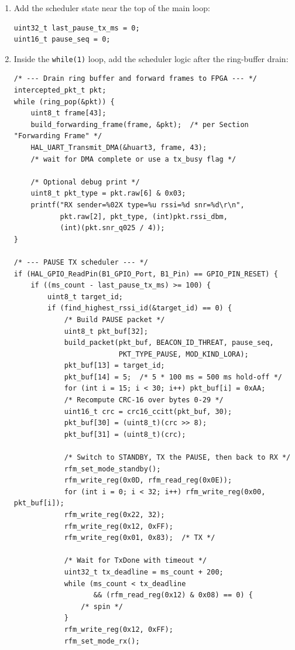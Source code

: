 \documentclass[11pt,letterpaper]{article}
\begin{document}
\begin{enumerate}[leftmargin=2em]
	\item Add the scheduler state near the top of the main loop:
\begin{verbatim}
uint32_t last_pause_tx_ms = 0;
uint16_t pause_seq = 0;
\end{verbatim}

	\item Inside the \texttt{while(1)} loop, add the scheduler logic after the ring-buffer drain:
\begin{verbatim}
/* --- Drain ring buffer and forward frames to FPGA --- */
intercepted_pkt_t pkt;
while (ring_pop(&pkt)) {
    uint8_t frame[43];
    build_forwarding_frame(frame, &pkt);  /* per Section "Forwarding Frame" */
    HAL_UART_Transmit_DMA(&huart3, frame, 43);
    /* wait for DMA complete or use a tx_busy flag */

    /* Optional debug print */
    uint8_t pkt_type = pkt.raw[6] & 0x03;
    printf("RX sender=%02X type=%u rssi=%d snr=%d\r\n",
           pkt.raw[2], pkt_type, (int)pkt.rssi_dbm,
           (int)(pkt.snr_q025 / 4));
}

/* --- PAUSE TX scheduler --- */
if (HAL_GPIO_ReadPin(B1_GPIO_Port, B1_Pin) == GPIO_PIN_RESET) {
    if ((ms_count - last_pause_tx_ms) >= 100) {
        uint8_t target_id;
        if (find_highest_rssi_id(&target_id) == 0) {
            /* Build PAUSE packet */
            uint8_t pkt_buf[32];
            build_packet(pkt_buf, BEACON_ID_THREAT, pause_seq,
                         PKT_TYPE_PAUSE, MOD_KIND_LORA);
            pkt_buf[13] = target_id;
            pkt_buf[14] = 5;  /* 5 * 100 ms = 500 ms hold-off */
            for (int i = 15; i < 30; i++) pkt_buf[i] = 0xAA;
            /* Recompute CRC-16 over bytes 0-29 */
            uint16_t crc = crc16_ccitt(pkt_buf, 30);
            pkt_buf[30] = (uint8_t)(crc >> 8);
            pkt_buf[31] = (uint8_t)(crc);

            /* Switch to STANDBY, TX the PAUSE, then back to RX */
            rfm_set_mode_standby();
            rfm_write_reg(0x0D, rfm_read_reg(0x0E));
            for (int i = 0; i < 32; i++) rfm_write_reg(0x00, pkt_buf[i]);
            rfm_write_reg(0x22, 32);
            rfm_write_reg(0x12, 0xFF);
            rfm_write_reg(0x01, 0x83);  /* TX */

            /* Wait for TxDone with timeout */
            uint32_t tx_deadline = ms_count + 200;
            while (ms_count < tx_deadline
                   && (rfm_read_reg(0x12) & 0x08) == 0) {
                /* spin */
            }
            rfm_write_reg(0x12, 0xFF);
            rfm_set_mode_rx();


\end{verbatim}
\end{enumerate}
\end{document}
